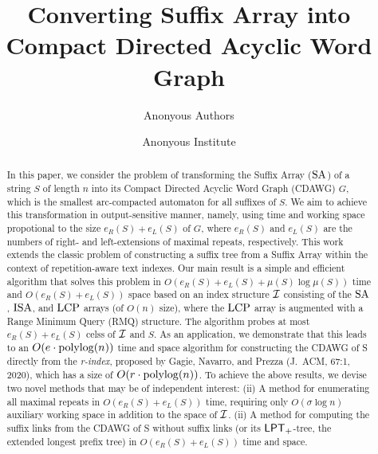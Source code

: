 \documentclass{article}
\title{
Converting Suffix Array into Compact Directed Acyclic Word Graph
}
\author{
Anonyous Authors
}
\date{Anonyous Institute}
\begin{document}
\maketitle

\begin{abstract}
  In this paper, we consider the problem of transforming the Suffix Array ($\mathrm{SA}$) of a string $S$ of length $n$ into its Compact Directed Acyclic Word Graph (CDAWG) $G$, which is the smallest arc-compacted automaton for all suffixes of $S$.
  We aim to achieve this transformation in output-sensitive manner, namely, using time and working space propotional to the size $e_R(S) + e_L(S)$ of $G$, where $e_R(S)$ and $e_L(S)$ are the numbers of right- and left-extensions of maximal repeats, respectively.
This work extends the classic problem of constructing a suffix tree from a Suffix Array within the context of repetition-aware text indexes.
Our main result is a simple and efficient algorithm that solves this problem in $O(e_R(S) + e_L(S) + \mu(S)\log \mu(S))$ time and $O(e_R(S) + e_L(S))$ space based on an index structure $\mathcal{I}$ consisting of the $\mathrm{SA}$, $\mathrm{ISA}$, and $\mathrm{LCP}$ arrays (of $O(n)$ size), where the $\mathrm{LCP}$ array is augmented with a Range Minimum Query (RMQ) structure. The algorithm probes at most $e_R(S) + e_L(S)$ celss of $\mathcal{I}$ and $S$.   
As an application, we demonstrate that this leads to an $O(e\cdot\operatorname{\mathrm{polylog}}(n))$ time and space algorithm for constructing the CDAWG of S directly from the \textit{r-index}, proposed by Gagie, Navarro, and Prezza (J.~ACM, 67:1, 2020), which has a size of $O(r\cdot\operatorname{\mathrm{polylog}}(n))$.
To achieve the above results, we devise two novel methods that may be of independent interest:
(ii) A method for enumerating all maximal repeats in $O(e_R(S) + e_L(S))$ time, requiring only $O(\sigma \log n)$ auxiliary working space in addition to the space of $\mathcal{I}$. 
(ii) A method for computing the suffix links from the CDAWG of S without suffix links (or its $\mathsf{LPT}_{+}$-tree, the extended longest prefix tree) in $O(e_R(S) + e_L(S))$ time and space.


\end{abstract}
\end{document}
